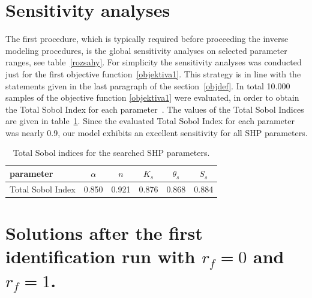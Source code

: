 \documentclass[review,times,3p,10pt]{elsarticle}
\begin{document}
 


\appendix
 \section{Sensitivity analyses} 

The first procedure, which is typically required before proceeding the inverse modeling procedures, is the global sensitivity analyses on  selected parameter ranges, see table~\ref{rozsahy}. For simplicity the sensitivity analyses was conducted just for the first objective function~\eqref{objektiva1}. This strategy is in line with the statements given in the last paragraph of the section~\ref{objdef}. In total 10.000 samples of the objective function \eqref{objektiva1}  were evaluated, in order to obtain the  Total Sobol Index for each parameter~\citep{kniha-citlivost}. The values of the Total Sobol Indices are given in table~\ref{citlivost}. Since the evaluated Total Sobol Index for each parameter was nearly 0.9, our model exhibits an excellent sensitivity for all SHP parameters. 

\begin{table}[ht]
\begin{center}
\caption{Total Sobol indices for the searched SHP parameters.}
\begin{small}
\doublespacing
\begin{tabular}{l||c c c c c}
\toprule
parameter & $\alpha$ & $n$ & $K_s$ & $\theta_s$ & $S_s$ \\ \hline
\toprule
Total Sobol Index & 0.850 & 0.921 & 0.876 & 0.868 & 0.884 \\
\toprule
\end{tabular}
\end{small}
\label{citlivost}
\end{center}
\end{table}

\section{Solutions after the first identification run with $r_f=0$ and $r_f=1$.}
\end{document}
